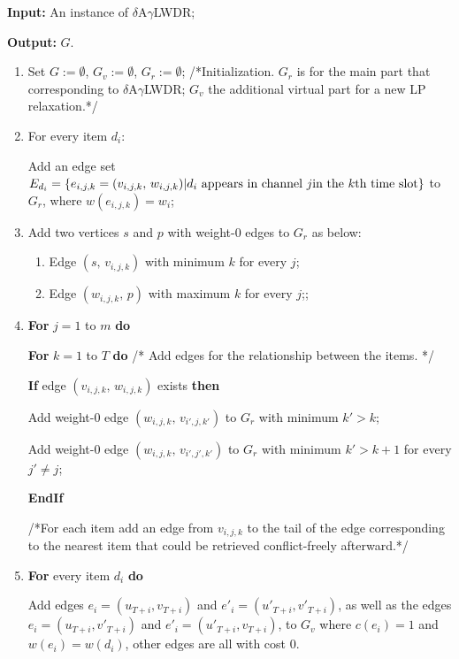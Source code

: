 \documentclass[11pt,english,onecolumn,draftcls]{IEEEtran}
\theoremstyle{plain}
\theoremstyle{plain}
\theoremstyle{plain}
\theoremstyle{plain}
\begin{document}
\begin{algorithm}
\textbf{Input: }An instance of $\delta$A$\gamma$LWDR;

\textbf{Output:} $G$.
\begin{enumerate}
\item Set $G:=\emptyset$, $G_{v}:=\emptyset$, $G_{r}:=\emptyset$; /{*}Initialization.
$G_{r}$ is for the main part that corresponding to $\delta$A$\gamma$LWDR;
$G_{v}$ the additional virtual part for a new LP relaxation.{*}/
\item For every item $d_{i}$:


\textbf{\quad{}}Add an edge set $E_{d_{i}}=\{e_{i,j,k}=(v_{i,j,k},\, w_{i,j,k})\vert d_{i}\mbox{ appears in channel \ensuremath{j}in the }k\mbox{th time slot}\}$
to $G_{r}$, where $w(e_{i,j,k})=w_{i}$;

\item Add two vertices $s$ and $p$ with weight-0 edges to $G_{r}$ as
below:

\begin{enumerate}
\item Edge $(s,\, v_{i,j,k})$ with minimum $k$ for every $j$;
\item Edge $(w_{i,j,k},\, p)$ with maximum $k$ for every $j$;;
\end{enumerate}
\item \textbf{For} $j=1$ to $m$ \textbf{do}


\textbf{\quad{}For} $k=1$ to $T$ \textbf{do \quad{}}/{*} Add edges
for the relationship between the items. {*}/


\textbf{\quad{}\quad{}If} edge $(v{}_{i,j,k},\, w_{i,j,k})$ exists
\textbf{then}


\textbf{\quad{}\quad{}\quad{}}Add weight-0 edge $(w{}_{i,j,k},\, v_{i',j,k'})$
to $G_{r}$ with minimum $k'>k$;


\textbf{\quad{}\quad{}\quad{}}Add weight-0 edge $(w_{i,j,k},\, v_{i',j',k'})$
to $G_{r}$ with minimum $k'>k+1$ for every $j'\neq j$;


\textbf{\quad{}\quad{}EndIf}


/{*}For each item add an edge from $v{}_{i,j,k}$ to the tail of the
edge corresponding to the nearest item that could be retrieved conflict-freely
afterward.{*}/

\item \textbf{For} every item $d_{i}$ \textbf{do}


\textbf{\quad{}}Add edges $e_{i}=(u_{T+i},v_{T+i})$ and $e'_{i}=(u'_{T+i},v'_{T+i})$,
as well as the edges $e_{i}=(u_{T+i},v'_{T+i})$ and $e'_{i}=(u'_{T+i},v_{T+i})$,
to $G_{v}$ where $c(e_{i})=1$ and $w(e_{i})=w(d_{i})$, other edges
are all with cost 0.



\end{enumerate}
\end{algorithm}
\end{document}
